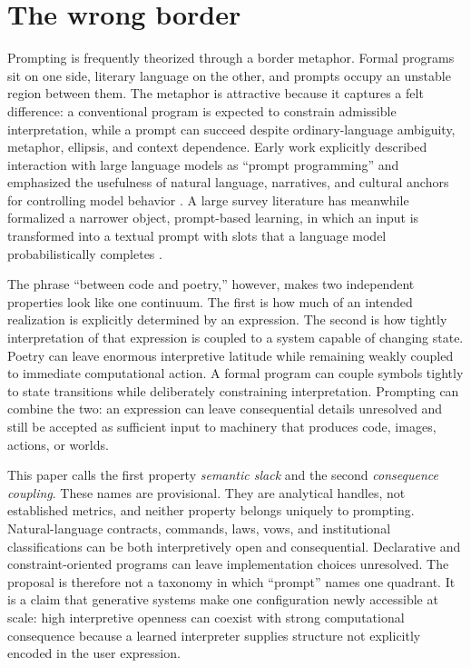 \documentclass[11pt]{article}
\begin{document}
\section{The wrong border}

Prompting is frequently theorized through a border metaphor. Formal programs sit on one side, literary language on the other, and prompts occupy an unstable region between them. The metaphor is attractive because it captures a felt difference: a conventional program is expected to constrain admissible interpretation, while a prompt can succeed despite ordinary-language ambiguity, metaphor, ellipsis, and context dependence. Early work explicitly described interaction with large language models as ``prompt programming'' and emphasized the usefulness of natural language, narratives, and cultural anchors for controlling model behavior \parencite{reynolds2021promptprogramming}. A large survey literature has meanwhile formalized a narrower object, prompt-based learning, in which an input is transformed into a textual prompt with slots that a language model probabilistically completes \parencite{liu2023pretrainpromptpredict}.

The phrase ``between code and poetry,'' however, makes two independent properties look like one continuum. The first is how much of an intended realization is explicitly determined by an expression. The second is how tightly interpretation of that expression is coupled to a system capable of changing state. Poetry can leave enormous interpretive latitude while remaining weakly coupled to immediate computational action. A formal program can couple symbols tightly to state transitions while deliberately constraining interpretation. Prompting can combine the two: an expression can leave consequential details unresolved and still be accepted as sufficient input to machinery that produces code, images, actions, or worlds.

This paper calls the first property \emph{semantic slack} and the second \emph{consequence coupling}. These names are provisional. They are analytical handles, not established metrics, and neither property belongs uniquely to prompting. Natural-language contracts, commands, laws, vows, and institutional classifications can be both interpretively open and consequential. Declarative and constraint-oriented programs can leave implementation choices unresolved. The proposal is therefore not a taxonomy in which ``prompt'' names one quadrant. It is a claim that generative systems make one configuration newly accessible at scale: high interpretive openness can coexist with strong computational consequence because a learned interpreter supplies structure not explicitly encoded in the user expression.
\end{document}
